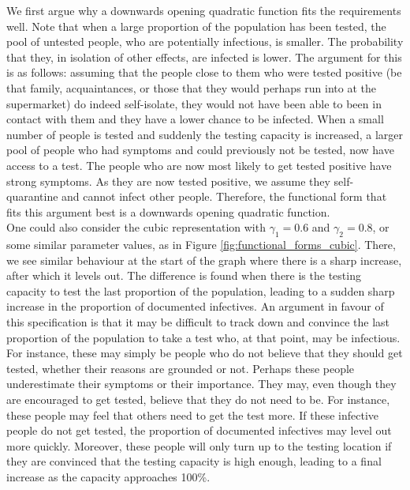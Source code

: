 \documentclass[12pt]{article}
\begin{document}
    
    We first argue why a downwards opening quadratic function fits the requirements well. Note that when a large proportion of the population has been tested, the pool of untested people, who are potentially infectious, is smaller. The probability that they, in isolation of other effects, are infected is lower. The argument for this is as follows: assuming that the people close to them who were tested positive (be that family, acquaintances, or those that they would perhaps run into at the supermarket) do indeed self-isolate, they would not have been able to been in contact with them and they have a lower chance to be infected. When a small number of people is tested and suddenly the testing capacity is increased, a larger pool of people who had symptoms and could previously not be tested, now have access to a test. The people who are now most likely to get tested positive have strong symptoms. As they are now tested positive, we assume they self-quarantine and cannot infect other people. Therefore, the functional form that fits this argument best is a downwards opening quadratic function. \\
    
    One could also consider the cubic representation with $\gamma_1=0.6$ and $\gamma_2=0.8$, or some similar parameter values, as in Figure \ref{fig:functional_forms_cubic}. There, we see similar behaviour at the start of the graph where there is a sharp increase, after which it levels out. The difference is found when there is the testing capacity to test the last proportion of the population, leading to a sudden sharp increase in the proportion of documented infectives. An argument in favour of this specification is that it may be difficult to track down and convince the last proportion of the population to take a test who, at that point, may be infectious. For instance, these may simply be people who do not believe that they should get tested, whether their reasons are grounded or not. Perhaps these people underestimate their symptoms or their importance. They may, even though they are encouraged to get tested, believe that they do not need to be. For instance, these people may feel that others need to get the test more. If these infective people do not get tested, the proportion of documented infectives may level out more quickly. Moreover, these people will only turn up to the testing location if they are convinced that the testing capacity is high enough, leading to a final increase as the capacity approaches 100\%. \\
    
\end{document}

